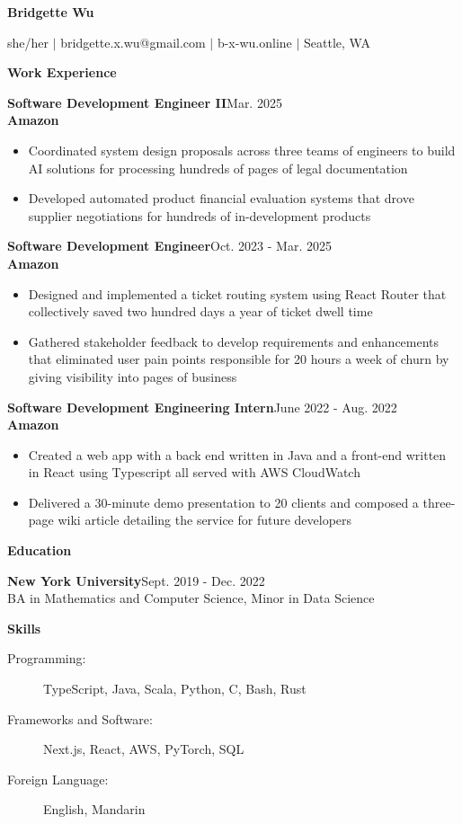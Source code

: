 \documentclass[11pt, oneside]{article}
\def\lralign #1#2{#1\hfill#2}
\def\experience #1#2#3{\vspace{6pt}\lralign{\textbf{\large#1}}{{#2}}\\#3}
\def\sectionheader #1{\vspace{15pt}\textbf{\Large #1}}
\begin{document}
\textbf{\LARGE Bridgette Wu}

she/her $\mid$ bridgette.x.wu@gmail.com $\mid$ b-x-wu.online $\mid$ Seattle, WA

\sectionheader{Work Experience}

\experience{Software Development Engineer II}{Mar. 2025}{\textbf{Amazon}}
\begin{itemize}
\item Coordinated system design proposals across three teams of engineers to build AI solutions for
processing hundreds of pages of legal documentation

\item Developed automated product financial evaluation systems that drove supplier negotiations for
hundreds of in-development products
\end{itemize}

\experience{Software Development Engineer}{Oct. 2023 - Mar. 2025}{\textbf{Amazon}}

\begin{itemize}
\item Designed and implemented a ticket routing system using React Router that collectively saved
two hundred days a year of ticket dwell time

\item Gathered stakeholder feedback to develop requirements and enhancements that eliminated user
pain points responsible for 20 hours a week of churn by giving visibility into pages of business
\end{itemize}

\experience{Software Development Engineering Intern}{June 2022 - Aug. 2022}{\textbf{Amazon}}

\begin{itemize}
\item Created a web app with a back end written in Java and a front-end written in React using
Typescript all served with AWS CloudWatch

\item Delivered a 30-minute demo presentation to 20 clients and composed a three-page wiki article
detailing the service for future developers
\end{itemize}

\sectionheader{Education}

\experience{New York University}{Sept. 2019 - Dec. 2022}{BA in Mathematics and Computer Science, Minor in Data Science}

\sectionheader{Skills}

\begin{description}
\item[Programming:] TypeScript, Java, Scala, Python, C, Bash, Rust

\item[Frameworks and Software:] Next.js, React, AWS, PyTorch, SQL

\item[Foreign Language:] English, Mandarin
\end{description}
\end{document}
